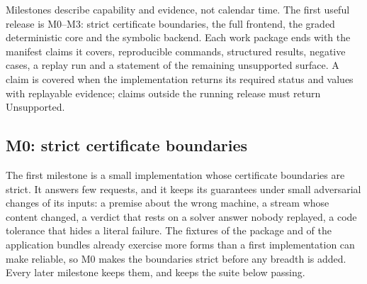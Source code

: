 \documentclass[11pt]{article}
\begin{document}
Milestones describe capability and evidence, not calendar time. The first useful release is
M0--M3: strict certificate boundaries, the full frontend, the graded deterministic core and the
symbolic backend. Each work package ends with the manifest claims it covers, reproducible commands, structured
results, negative cases, a replay run and a statement of the remaining unsupported surface. A claim
is covered when the implementation returns its required status and values with replayable evidence;
claims outside the running release must return Unsupported.

\subsection{M0: strict certificate boundaries}\label{sec:negative}

The first milestone is a small implementation whose certificate boundaries are strict. It answers
few requests, and it keeps its guarantees under small adversarial changes of its inputs: a premise
about the wrong machine, a stream whose content changed, a verdict that rests on a solver answer
nobody replayed, a code tolerance that hides a literal failure. The fixtures of the package and of
the application bundles already exercise more forms than a first implementation can make reliable,
so M0 makes the boundaries strict before any breadth is added. Every later milestone keeps them, and
keeps the suite below passing.
\end{document}

